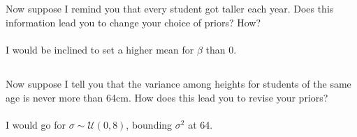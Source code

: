 \documentclass{article}
\begin{document}
\subsection{}
Now suppose I remind you that every student got taller each year.
Does this information lead you to change your choice of priors? How? \\~\\
I would be inclined to set a higher mean for $\beta$ than 0.

\subsection{}
Now suppose I tell you that the variance among heights for students of the same age is
never more than 64cm. How does this lead you to revise your priors? \\~\\
I would go for $\sigma \sim \mathcal{U}(0, 8)$, bounding $\sigma^2$ at 64.
\end{document}
